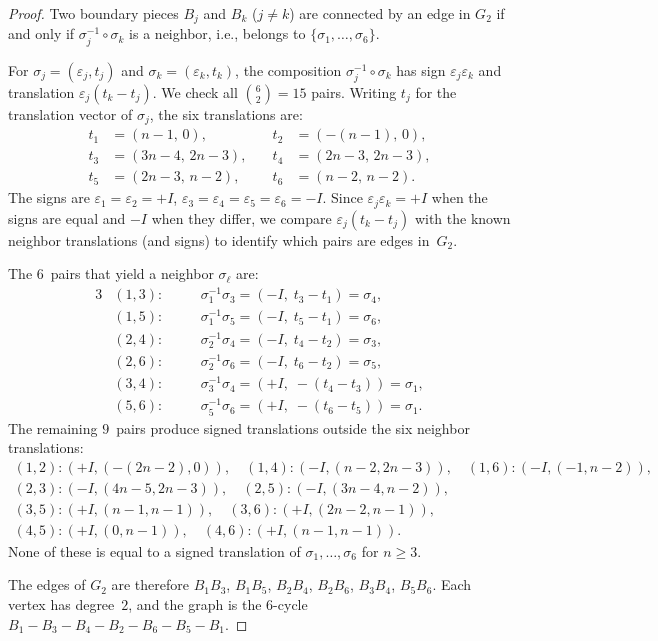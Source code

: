 \documentclass{amsart}
\theoremstyle{definition}
\theoremstyle{remark}
\begin{document}
\begin{proof}
Two boundary pieces $B_j$ and $B_k$ ($j \ne k$) are connected by an
edge in $G_2$ if and only if $\sigma_j^{-1} \circ \sigma_k$ is a
neighbor, i.e., belongs to $\{\sigma_1, \ldots, \sigma_6\}$.

For $\sigma_j = (\varepsilon_j, t_j)$ and $\sigma_k = (\varepsilon_k, t_k)$,
the composition $\sigma_j^{-1} \circ \sigma_k$ has sign
$\varepsilon_j \varepsilon_k$ and translation
$\varepsilon_j(t_k - t_j)$.  We check all $\binom{6}{2} = 15$ pairs.
Writing $t_j$ for the translation vector of $\sigma_j$, the six
translations are:
\[
\begin{aligned}
  t_1 &= (n{-}1,\, 0), &\quad
  t_2 &= (-(n{-}1),\, 0), \\
  t_3 &= (3n{-}4,\, 2n{-}3), &\quad
  t_4 &= (2n{-}3,\, 2n{-}3), \\
  t_5 &= (2n{-}3,\, n{-}2), &\quad
  t_6 &= (n{-}2,\, n{-}2).
\end{aligned}
\]
The signs are $\varepsilon_1 = \varepsilon_2 = +I$,\;
$\varepsilon_3 = \varepsilon_4 = \varepsilon_5 = \varepsilon_6 = -I$.
Since $\varepsilon_j \varepsilon_k = +I$ when the signs are equal and
$-I$ when they differ, we compare $\varepsilon_j(t_k - t_j)$
with the known neighbor translations (and signs) to identify which
pairs are edges in~$G_2$.

The $6$~pairs that yield a neighbor $\sigma_\ell$ are:
\begin{alignat*}{3}
  &(1,3):&\quad &\sigma_1^{-1}\sigma_3 = (-I,\; t_3 - t_1) = \sigma_4,\\
  &(1,5):&\quad &\sigma_1^{-1}\sigma_5 = (-I,\; t_5 - t_1) = \sigma_6,\\
  &(2,4):&\quad &\sigma_2^{-1}\sigma_4 = (-I,\; t_4 - t_2) = \sigma_3,\\
  &(2,6):&\quad &\sigma_2^{-1}\sigma_6 = (-I,\; t_6 - t_2) = \sigma_5,\\
  &(3,4):&\quad &\sigma_3^{-1}\sigma_4 = (+I,\; -(t_4 - t_3)) = \sigma_1,\\
  &(5,6):&\quad &\sigma_5^{-1}\sigma_6 = (+I,\; -(t_6 - t_5)) = \sigma_1.
\end{alignat*}
The remaining $9$~pairs produce signed translations outside the six
neighbor translations:
\[
\begin{gathered}
  (1,2): (+I, (-(2n{-}2),0)),\quad
  (1,4): (-I, (n{-}2,2n{-}3)),\quad
  (1,6): (-I, (-1,n{-}2)),\\
  (2,3): (-I, (4n{-}5,2n{-}3)),\quad
  (2,5): (-I, (3n{-}4,n{-}2)),\\
  (3,5): (+I, (n{-}1,n{-}1)),\quad
  (3,6): (+I, (2n{-}2,n{-}1)),\\
  (4,5): (+I, (0,n{-}1)),\quad
  (4,6): (+I, (n{-}1,n{-}1)).
\end{gathered}
\]
None of these is equal to a signed translation of
$\sigma_1,\ldots,\sigma_6$ for $n \ge 3$.

The edges of $G_2$ are therefore $B_1 B_3$,\; $B_1 B_5$,\; $B_2 B_4$,\;
$B_2 B_6$,\; $B_3 B_4$,\; $B_5 B_6$.\;  Each vertex has degree~$2$,
and the graph is the $6$-cycle
$B_1 - B_3 - B_4 - B_2 - B_6 - B_5 - B_1$.
\end{proof}
\end{document}
